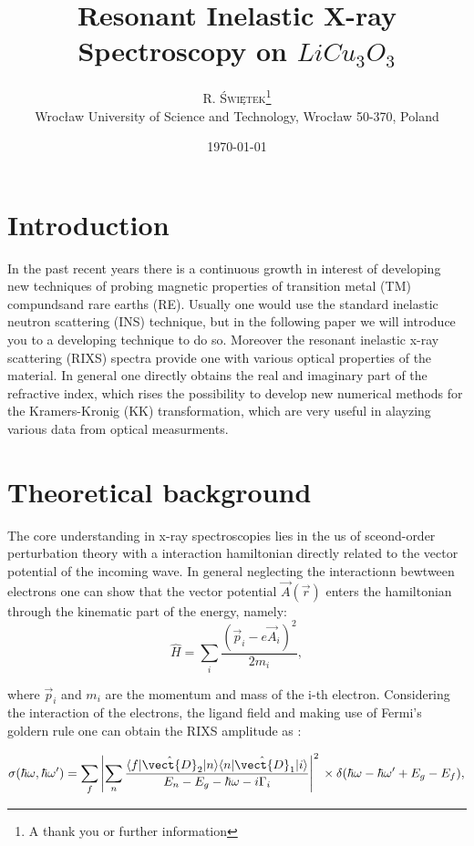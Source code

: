 \documentclass[twoside,twocolumn, elsart]{article}
\title{Resonant Inelastic X-ray Spectroscopy on $LiCu_3 O_3$ }
\author{%
\textsc{R. Świętek}\thanks{A thank you or further information} \\[1ex] 
\normalsize Wrocław University of Science and Technology, Wrocław 50-370, Poland \\ 
}
\date{\today} %
\begin{document}
\maketitle

\section{Introduction}
In the past recent years there is a continuous growth in interest of developing new techniques of probing magnetic properties of transition metal (TM) compundsand rare earths (RE). Usually one would use the standard inelastic neutron scattering (INS) technique, but in the following paper we will introduce you to a developing technique to do so. Moreover the resonant inelastic x-ray scattering (RIXS) spectra provide one with various optical properties of the material. In general one directly obtains the real and imaginary part of the refractive index, which rises the possibility to develop new numerical methods for the Kramers-Kronig (KK) transformation, which are very useful in alayzing various data from optical measurments.

\section{Theoretical background}

The core understanding in x-ray spectroscopies lies in the us of sceond-order perturbation theory with a interaction hamiltonian directly related to the vector potential of the incoming wave. In general neglecting the interactionn bewtween electrons one can show that the vector potential $\vec{A}(\vec{r})$ enters the hamiltonian through the kinematic part of the energy, namely:
\begin{equation}\label{eq: hamil}
\hat{H} = \sum_i\frac{(\vec{p}_i-e\vec{A}_i)^2}{2m_i},
\end{equation}

\noindent where $\vec{p}_i$ and $m_i$ are the momentum and mass of the i-th electron. Considering the interaction of the electrons, the ligand field and making use of Fermi's goldern rule one can obtain the RIXS amplitude as \cite{Schulke}:

\begin{equation}\label{eq: Kramer Heisenberg}
\sigma(\hbar\omega,\hbar\omega')=\sum_f\left|\sum_n\frac{\langle f|\hat{\vect{D}}_2 |n\rangle \langle n|\hat{\vect{D}}_1|i\rangle}{E_n-E_g-\hbar\omega-i\Gamma_i}\right|^2\\
\times\delta(\hbar\omega-\hbar\omega'+E_g-E_f),
\end{equation}
\end{document}

